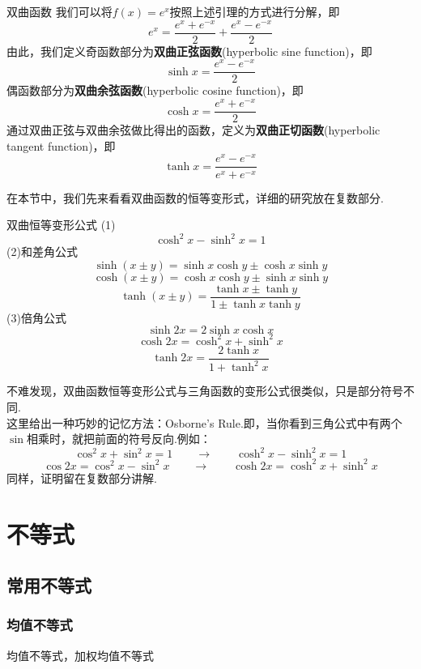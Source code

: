 \documentclass[lang=cn, zihao=5]{elegantbook}
\begin{document}
\begin{definition}{双曲函数}
    我们可以将$f(x)=e^x$按照上述引理的方式进行分解，即$$e^x=\frac{e^x+e^{-x}}{2}+\frac{e^x-e^{-x}}{2}$$
    由此，我们定义奇函数部分为\textbf{双曲正弦函数}(hyperbolic sine function)，即$$\sinh{x}=\frac{e^x-e^{-x}}{2}$$
    偶函数部分为\textbf{双曲余弦函数}(hyperbolic cosine function)，即$$\cosh{x}=\frac{e^x+e^{-x}}{2}$$
    通过双曲正弦与双曲余弦做比得出的函数，定义为\textbf{双曲正切函数}(hyperbolic tangent function)，即$$\tanh{x}=\frac{e^x-e^{-x}}{e^x+e^{-x}}$$
\end{definition}

在本节中，我们先来看看双曲函数的恒等变形式，详细的研究放在复数部分.

\begin{proposition}{双曲恒等变形公式}
    (1)$$\cosh^2{x}-\sinh^2{x}=1$$
    (2)和差角公式
    $$\sinh{(x \pm y)}=\sinh{x}\cosh{y} \pm \cosh{x}\sinh{y}$$
    $$\cosh{(x \pm y)}=\cosh{x}\cosh{y} \pm \sinh{x}\sinh{y}$$
    $$\tanh{(x \pm y)}=\frac{\tanh{x} \pm \tanh{y}}{1 \pm \tanh{x}\tanh{y}}$$
    (3)倍角公式
    $$\sinh{2x}=2\sinh{x}\cosh{x}$$
    $$\cosh{2x}=\cosh^2{x}+\sinh^2{x}$$
    $$\tanh{2x}=\frac{2\tanh{x}}{1+\tanh^2{x}}$$
\end{proposition}
\begin{remark}
    不难发现，双曲函数恒等变形公式与三角函数的变形公式很类似，只是部分符号不同.\\
    这里给出一种巧妙的记忆方法：Osborne's Rule.即，当你看到三角公式中有两个$\sin$相乘时，就把前面的符号反向.例如：$$\cos^2{x}+\sin^2{x}=1 \qquad \longrightarrow \qquad \cosh^2{x}-\sinh^2{x}=1$$
    $$\cos{2x}=\cos^2{x}-\sin^2{x} \qquad \longrightarrow \qquad \cosh{2x}=\cosh^2{x}+\sinh^2{x}$$
    同样，证明留在复数部分讲解.
\end{remark}


\chapter{不等式}

\section{常用不等式}

\subsection{均值不等式}

均值不等式，加权均值不等式
\end{document}
